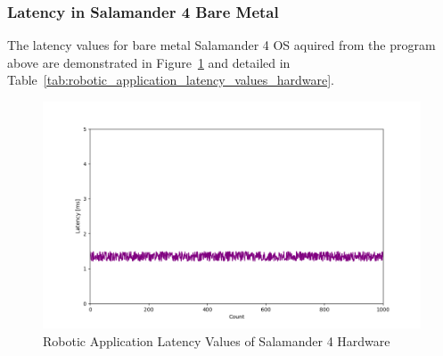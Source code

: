 \documentclass[MMR,Master,english]{twbook}
\begin{document}

\clearpage

\subsubsection{Latency in Salamander 4 Bare Metal}\label{subsubsec:latency_hardware}
\noindent The latency values for bare metal Salamander 4 OS aquired from the program above are demonstrated in Figure~\ref{fig:rtos_latencies} and detailed in Table~\ref{tab:robotic_application_latency_values_hardware}. 

\begin{figure}[H]
	\centering
	\includegraphics[width=1.0\columnwidth]{masterthesis-documentation/docs/resources/scripts/experiment/generated_latencies/rtos_latencies.png}
	\caption[Robotic Application Latency Values of Salamander 4 Hardware]{Robotic Application Latency Values of Salamander 4 Hardware}
	\label{fig:rtos_latencies}
\end{figure}
\end{document}
